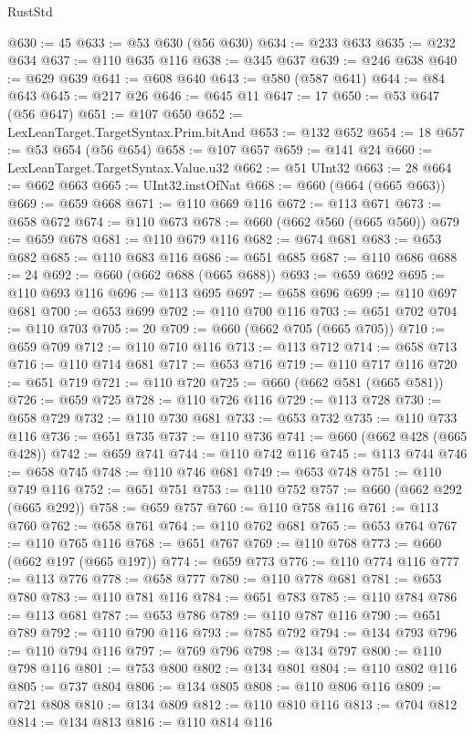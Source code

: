 \begin{lexlean}{RustStd}
\begin{coremodule}
@630 := 45
@633 := @53 @630 (@56 @630)
@634 := @233 @633
@635 := @232 @634
@637 := @110 @635 @116
@638 := @345 @637
@639 := @246 @638
@640 := @629 @639
@641 := @608 @640
@643 := @580 (@587 @641)
@644 := @84 @643
@645 := @217 @26
@646 := @645 @11
@647 := 17
@650 := @53 @647 (@56 @647)
@651 := @107 @650
@652 := LexLeanTarget.TargetSyntax.Prim.bitAnd
@653 := @132 @652
@654 := 18
@657 := @53 @654 (@56 @654)
@658 := @107 @657
@659 := @141 @24
@660 := LexLeanTarget.TargetSyntax.Value.u32
@662 := @51 UInt32
@663 := 28
@664 := @662 @663
@665 := UInt32.instOfNat
@668 := @660 (@664 (@665 @663))
@669 := @659 @668
@671 := @110 @669 @116
@672 := @113 @671
@673 := @658 @672
@674 := @110 @673
@678 := @660 (@662 @560 (@665 @560))
@679 := @659 @678
@681 := @110 @679 @116
@682 := @674 @681
@683 := @653 @682
@685 := @110 @683 @116
@686 := @651 @685
@687 := @110 @686
@688 := 24
@692 := @660 (@662 @688 (@665 @688))
@693 := @659 @692
@695 := @110 @693 @116
@696 := @113 @695
@697 := @658 @696
@699 := @110 @697 @681
@700 := @653 @699
@702 := @110 @700 @116
@703 := @651 @702
@704 := @110 @703
@705 := 20
@709 := @660 (@662 @705 (@665 @705))
@710 := @659 @709
@712 := @110 @710 @116
@713 := @113 @712
@714 := @658 @713
@716 := @110 @714 @681
@717 := @653 @716
@719 := @110 @717 @116
@720 := @651 @719
@721 := @110 @720
@725 := @660 (@662 @581 (@665 @581))
@726 := @659 @725
@728 := @110 @726 @116
@729 := @113 @728
@730 := @658 @729
@732 := @110 @730 @681
@733 := @653 @732
@735 := @110 @733 @116
@736 := @651 @735
@737 := @110 @736
@741 := @660 (@662 @428 (@665 @428))
@742 := @659 @741
@744 := @110 @742 @116
@745 := @113 @744
@746 := @658 @745
@748 := @110 @746 @681
@749 := @653 @748
@751 := @110 @749 @116
@752 := @651 @751
@753 := @110 @752
@757 := @660 (@662 @292 (@665 @292))
@758 := @659 @757
@760 := @110 @758 @116
@761 := @113 @760
@762 := @658 @761
@764 := @110 @762 @681
@765 := @653 @764
@767 := @110 @765 @116
@768 := @651 @767
@769 := @110 @768
@773 := @660 (@662 @197 (@665 @197))
@774 := @659 @773
@776 := @110 @774 @116
@777 := @113 @776
@778 := @658 @777
@780 := @110 @778 @681
@781 := @653 @780
@783 := @110 @781 @116
@784 := @651 @783
@785 := @110 @784
@786 := @113 @681
@787 := @653 @786
@789 := @110 @787 @116
@790 := @651 @789
@792 := @110 @790 @116
@793 := @785 @792
@794 := @134 @793
@796 := @110 @794 @116
@797 := @769 @796
@798 := @134 @797
@800 := @110 @798 @116
@801 := @753 @800
@802 := @134 @801
@804 := @110 @802 @116
@805 := @737 @804
@806 := @134 @805
@808 := @110 @806 @116
@809 := @721 @808
@810 := @134 @809
@812 := @110 @810 @116
@813 := @704 @812
@814 := @134 @813
@816 := @110 @814 @116

\end{coremodule}
\end{lexlean}
